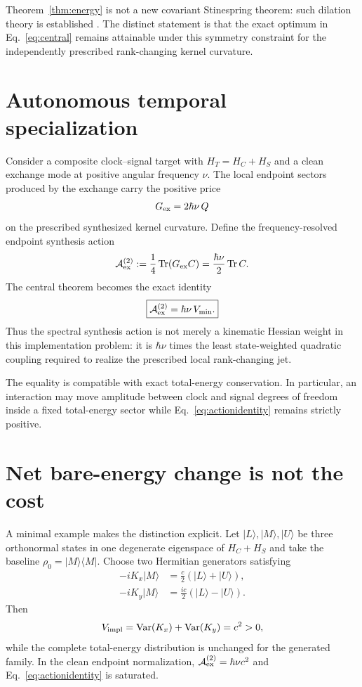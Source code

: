 \documentclass[aps,pra,preprint,nofootinbib]{revtex4-2}
\newcommand{\Tr}{\operatorname{Tr}}
\newcommand{\Var}{\operatorname{Var}}
\newcommand{\cA}{\mathcal A}
\newcommand{\rhozero}{\rho_0}
\newcommand{\Vimpl}{V_{\rm impl}}
\newcommand{\Vmin}{V_{\min}}
\newcommand{\Cker}{C}
\newcommand{\HT}{H_T}
\begin{document}
Theorem~\ref{thm:energy} is not a new covariant Stinespring theorem: such dilation theory is established \cite{Scutaru1979}. The distinct statement is that the exact optimum in Eq.~\eqref{eq:central} remains attainable under this symmetry constraint for the independently prescribed rank-changing kernel curvature.

\section{Autonomous temporal specialization}

Consider a composite clock--signal target with $\HT=H_C+H_S$ and a clean exchange mode at positive angular frequency $\nu$. The local endpoint sectors produced by the exchange carry the positive price
\begin{equation}
 G_{\rm ex}=2\hbar\nu\,Q
 \label{eq:Gex}
\end{equation}
on the prescribed synthesized kernel curvature. Define the frequency-resolved endpoint synthesis action
\begin{equation}
 \cA_{\rm ex}^{(2)}:=\frac14\Tr(G_{\rm ex}\Cker)
 =\frac{\hbar\nu}{2}\Tr\Cker.
 \label{eq:Aex}
\end{equation}
The central theorem becomes the exact identity
\begin{equation}
 \boxed{
 \cA_{\rm ex}^{(2)}=\hbar\nu\,\Vmin.
 }
 \label{eq:actionidentity}
\end{equation}
Thus the spectral synthesis action is not merely a kinematic Hessian weight in this implementation problem: it is $\hbar\nu$ times the least state-weighted quadratic coupling required to realize the prescribed local rank-changing jet.

The equality is compatible with exact total-energy conservation. In particular, an interaction may move amplitude between clock and signal degrees of freedom inside a fixed total-energy sector while Eq.~\eqref{eq:actionidentity} remains strictly positive.

\section{Net bare-energy change is not the cost}

A minimal example makes the distinction explicit. Let $|L\rangle,|M\rangle,|U\rangle$ be three orthonormal states in one degenerate eigenspace of $H_C+H_S$ and take the baseline $\rhozero=|M\rangle\langle M|$. Choose two Hermitian generators satisfying
\begin{align}
 -iK_x|M\rangle&=\frac c2(|L\rangle+|U\rangle),\\
 -iK_y|M\rangle&=\frac{ic}{2}(|L\rangle-|U\rangle).
\end{align}
Then
\begin{equation}
 \Vimpl=\Var(K_x)+\Var(K_y)=c^2>0,
\end{equation}
while the complete total-energy distribution is unchanged for the generated family. In the clean endpoint normalization, $\cA_{\rm ex}^{(2)}=\hbar\nu c^2$ and Eq.~\eqref{eq:actionidentity} is saturated.
\end{document}
